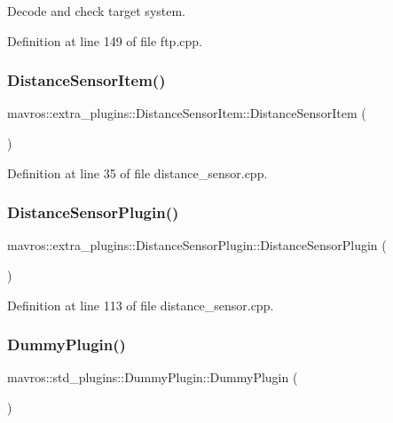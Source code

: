 Decode and check target system. 



Definition at line 149 of file ftp.\+cpp.

\mbox{\label{group__plugin_ga4a5d2662de657c6d326a0e3dc697d889}} 
\subsubsection{\texorpdfstring{DistanceSensorItem()}{DistanceSensorItem()}}
{\footnotesize\ttfamily mavros\+::extra\+\_\+plugins\+::\+Distance\+Sensor\+Item\+::\+Distance\+Sensor\+Item (\begin{DoxyParamCaption}{ }\end{DoxyParamCaption})\hspace{0.3cm}{\ttfamily [inline]}}



Definition at line 35 of file distance\+\_\+sensor.\+cpp.

\mbox{\label{group__plugin_gab36caa4b5744d09640626f1cc69671a0}} 
\subsubsection{\texorpdfstring{DistanceSensorPlugin()}{DistanceSensorPlugin()}}
{\footnotesize\ttfamily mavros\+::extra\+\_\+plugins\+::\+Distance\+Sensor\+Plugin\+::\+Distance\+Sensor\+Plugin (\begin{DoxyParamCaption}{ }\end{DoxyParamCaption})\hspace{0.3cm}{\ttfamily [inline]}}



Definition at line 113 of file distance\+\_\+sensor.\+cpp.

\mbox{\label{group__plugin_ga86a0b9e56760d9d51fc5bfc8f3e358af}} 
\subsubsection{\texorpdfstring{DummyPlugin()}{DummyPlugin()}}
{\footnotesize\ttfamily mavros\+::std\+\_\+plugins\+::\+Dummy\+Plugin\+::\+Dummy\+Plugin (\begin{DoxyParamCaption}{ }\end{DoxyParamCaption})\hspace{0.3cm}{\ttfamily [inline]}}



